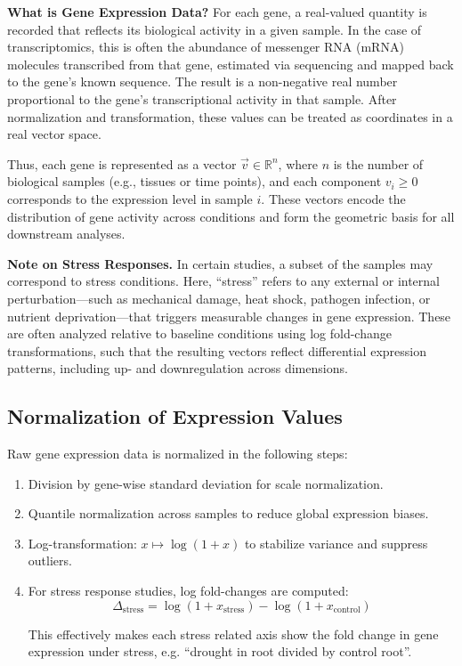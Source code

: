 \documentclass[11pt]{article}
\begin{document}
\vspace{0.5cm}
\noindent
\textbf{What is Gene Expression Data?} For each gene, a real-valued quantity is
recorded that reflects its biological activity in a given sample. In the case
of transcriptomics, this is often the abundance of messenger RNA (mRNA) molecules
transcribed from that gene, estimated via sequencing and mapped back to the
gene's known sequence. The result is a non-negative real number proportional to
the gene's transcriptional activity in that sample. After normalization and
transformation, these values can be treated as coordinates in a real vector space.

Thus, each gene is represented as a vector $\vec{v}\in \mathbb{R}^{n}$, where $n$
is the number of biological samples (e.g., tissues or time points), and each
component $v_{i} \geq 0$ corresponds to the expression level in sample $i$. These
vectors encode the distribution of gene activity across conditions and form the
geometric basis for all downstream analyses.

\vspace{0.5cm}
\noindent
\textbf{Note on Stress Responses.} In certain studies, a subset of the samples
may correspond to stress conditions. Here, “stress” refers to any external or internal
perturbation—such as mechanical damage, heat shock, pathogen infection, or
nutrient deprivation—that triggers measurable changes in gene expression. These
are often analyzed relative to baseline conditions using log fold-change transformations,
such that the resulting vectors reflect differential expression patterns, including
up- and downregulation across dimensions.

\subsection{Normalization of Expression Values}
Raw gene expression data is normalized in the following steps:
\begin{enumerate}
	\item Division by gene-wise standard deviation for scale normalization.
	      
	\item Quantile normalization across samples to reduce global expression biases.
	      
	\item Log-transformation: $x \mapsto \log(1 + x)$ to stabilize variance and
	      suppress outliers.
	      
	\item For stress response studies, log fold-changes are computed:
	      \[
	      	\Delta_{\text{stress}}= \log(1 + x_{\text{stress}}) - \log(1 + x_{\text{control}}
	      	) \text{}
	      \]
	      
	      \noindent
	      This effectively makes each stress related axis show the fold change in
	      gene expression under stress, e.g. ``drought in root divided by control
	      root''.
\end{enumerate}
\end{document}
